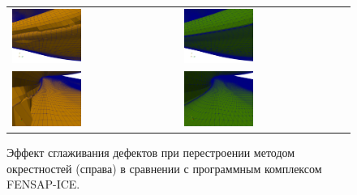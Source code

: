 \documentclass[a4paper,14pt]{extarticle}                     %
\theoremstyle{plain}                                         %
\begin{document}
\begin{figure}[!ht]
\centering
\begin{tabular}{ll}
\includegraphics[width=0.43\textwidth]{pics/text_1_remesh_3d/fens1.png}
&
\includegraphics[width=0.43\textwidth]{pics/text_1_remesh_3d/crys1.png} \\
\includegraphics[width=0.43\textwidth]{pics/text_1_remesh_3d/fens2.png}
&
\includegraphics[width=0.43\textwidth]{pics/text_1_remesh_3d/crys2.png}
\end{tabular}
\singlespacing
\caption{Эффект сглаживания дефектов при перестроении методом окрестностей (справа) в сравнении с программным комплексом FENSAP-ICE.}
\label{fig:text_1_remesh3_with_fensap}
\end{figure}
\end{document}

